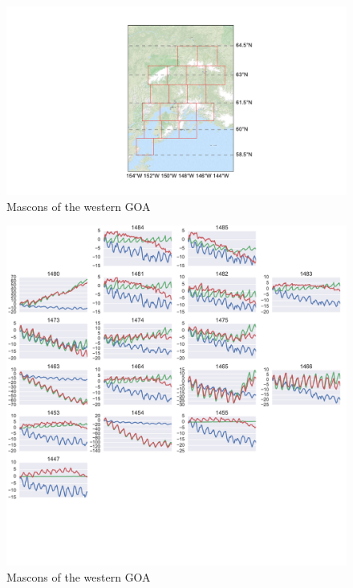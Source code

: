 \documentclass[review]{igs}
\begin{document}
\begin{figure}
\noindent\includegraphics[width=178mm]{figures/westernMap} \centering \caption{Mascons of the western GOA} \label{fig:summer}
\end{figure}

\begin{figure}
\noindent\includegraphics[width=178mm]{figures/westernPlot} \centering \caption{Mascons of the western GOA} \label{fig:summer}
\end{figure}
\end{document}
